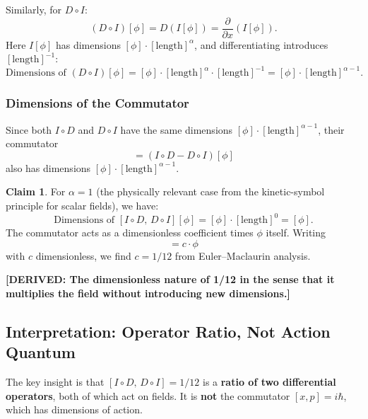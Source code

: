 \documentclass[12pt]{article}
\theoremstyle{definition}
\newtheorem{claim}[theorem]{Claim}
\newcommand{\DERIVED}[1]{\textcolor{derivedcolor}{\textbf{[DERIVED: #1]}}}
\begin{document}
Similarly, for $D\circ I$:
\begin{equation}
  (D\circ I)[\phi] = D(I[\phi]) = \frac{\partial}{\partial x}(I[\phi]).
\end{equation}
Here $I[\phi]$ has dimensions $[\phi] \cdot [\mathrm{length}]^\alpha$, and differentiating
introduces $[\mathrm{length}]^{-1}$:
\begin{equation}
  \text{Dimensions of } (D\circ I)[\phi] = [\phi] \cdot [\mathrm{length}]^\alpha \cdot [\mathrm{length}]^{-1}
  = [\phi] \cdot [\mathrm{length}]^{\alpha-1}.
\end{equation}

\subsubsection{Dimensions of the Commutator}

Since both $I\circ D$ and $D\circ I$ have the same dimensions $[\phi] \cdot [\mathrm{length}]^{\alpha-1}$,
their commutator
\begin{equation}
  [I\circ D,\, D\circ I][\phi] = (I\circ D - D\circ I)[\phi]
\end{equation}
also has dimensions $[\phi] \cdot [\mathrm{length}]^{\alpha-1}$.

\begin{claim}
For $\alpha = 1$ (the physically relevant case from the kinetic-symbol principle for
scalar fields), we have:
\begin{equation}
  \text{Dimensions of } [I\circ D,\, D\circ I][\phi] = [\phi] \cdot [\mathrm{length}]^{0} = [\phi].
\end{equation}
The commutator acts as a dimensionless coefficient times $\phi$ itself. Writing
\begin{equation}
  [I\circ D,\, D\circ I][\phi] = c \cdot \phi
\end{equation}
with $c$ dimensionless, we find $c = 1/12$ from Euler--Maclaurin analysis.
\end{claim}

\DERIVED{The dimensionless nature of 1/12 in the sense that it multiplies the field
without introducing new dimensions.}

\subsection{Interpretation: Operator Ratio, Not Action Quantum}

The key insight is that $[I\circ D,\, D\circ I] = 1/12$ is a \textbf{ratio of two
differential operators}, both of which act on fields. It is \textbf{not} the commutator
$[x, p] = i\hbar$, which has dimensions of action.
\end{document}
